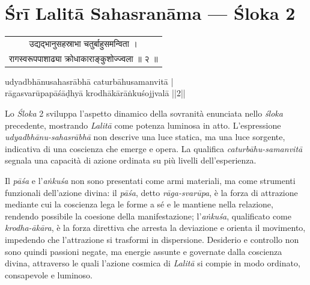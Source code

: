 \chapter*{Śrī Lalitā Sahasranāma — Śloka 2}

\begin{sloka}
{\sanskritfont
\begin{tabular}{c}
उद्यद्भानुसहस्राभा चतुर्बाहुसमन्विता ।\\
रागस्वरूपपाशाढ्या क्रोधाकाराङ्कुशोज्ज्वला ॥ २ ॥
\end{tabular}

\vspace{1.5em}

{\middlesize \iastfont
udyadbhānu­sahasrābhā caturbāhu­samanvitā |\\
rāga­svarūpa­pāśāḍhyā krodhākārāṅkuśojjvalā ||2||}

\vspace{1em}

{\middlesize
{}
}

\middlesize \iastfont {}

}
\end{sloka}


Lo \textit{Śloka} 2 sviluppa l’aspetto dinamico della sovranità enunciata nello \textit{śloka} precedente, mostrando \textit{Lalitā} come potenza luminosa in atto. L’espressione \textit{udyadbhānu-sahasrābhā} non descrive una luce statica, ma una luce sorgente, indicativa di una coscienza che emerge e opera. La qualifica \textit{caturbāhu-samanvitā} segnala una capacità di azione ordinata su più livelli dell’esperienza. 

Il \textit{pāśa} e l’\textit{aṅkuśa} non sono presentati come armi materiali, ma come strumenti funzionali dell’azione divina: il \textit{pāśa}, detto \textit{rāga-svarūpa}, è la forza di attrazione mediante cui la coscienza lega le forme a sé e le mantiene nella relazione, rendendo possibile la coesione della manifestazione; l’\textit{aṅkuśa}, qualificato come \textit{krodha-ākāra}, è la forza direttiva che arresta la deviazione e orienta il movimento, impedendo che l’attrazione si trasformi in dispersione. Desiderio e controllo non sono quindi passioni negate, ma energie assunte e governate dalla coscienza divina, attraverso le quali l’azione cosmica di \textit{Lalitā} si compie in modo ordinato, consapevole e luminoso.

